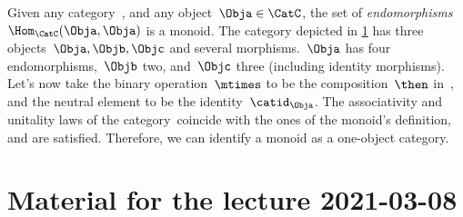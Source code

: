 \begin{example}
  Given any category~\CatC, and any object~$\Obja\in \CatC$, the set of \emph{endomorphisms}~$\Hom_{\CatC}(\Obja,\Obja)$ is a monoid. The category depicted in \cref{fig:monoid_endomorphisms} has three objects~$\Obja,\Objb,\Objc$ and several morphisms.~$\Obja$ has four endomorphisms,~$\Objb$ two, and~$\Objc$ three (including identity morphisms). Let's now take the binary operation~$\mtimes$ to be the composition~$\then$ in~\CatC, and the neutral element to be the identity~$\catid_\Obja$. The associativity and unitality laws of the category~\CatC coincide with the ones of the monoid's definition, and are satisfied. Therefore, we can identify a monoid as a one-object category.
\end{example}


\begin{figure}[h!]
  \begin{center}
    \caption{}
    \label{fig:monoid_endomorphisms}
  \end{center}
\end{figure}



\section{Material for the lecture 2021-03-08}

